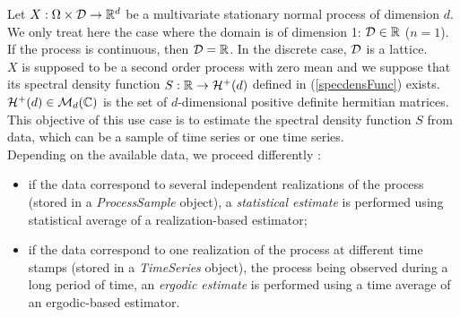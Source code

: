 \renewcommand{\filename}{docUC_StocProc_DensitySpectralModel_Estimation.tex}
\renewcommand{\filetitle}{UC : Estimation of a spectral density function}

\HeaderIIILevel


Let $X: \Omega \times {\mathcal D} \rightarrow {\mathbb R}^d$  be a multivariate  stationary normal process of dimension $d$. We only treat here the case where the domain is of dimension 1: ${\mathcal D} \in {\mathbb R}$ ($n=1$). \\
If the process is continuous, then ${\mathcal D}={\mathbb R}$. In the discrete case, ${\mathcal D}$  is a lattice. \\


$X$ is supposed to be a second order process with zero mean and we suppose that its spectral density function $S : {\mathbb R} \rightarrow \mathcal{H}^+(d)$ defined in (\ref{specdensFunc}) exists. $\mathcal{H}^+(d) \in \mathcal{M}_d({\mathbb C})$ is the set of $d$-dimensional positive definite hermitian matrices.\\


This objective of this use case is to estimate the spectral density function $S$ from data, which can be a sample of time series or one time series.\\
Depending on the available data, we proceed differently :
\begin{itemize}
\item if the data correspond to  several independent  realizations of the  process (stored in a \textit{ProcessSample} object), a \emph{statistical estimate} is performed using statistical average of a realization-based estimator;
\item if the data correspond to one realization of the  process  at different time stamps (stored in a  \textit{TimeSeries} object), the process being observed during a long period of time, an \emph{ergodic estimate} is performed using a time average of an ergodic-based estimator.
\end{itemize}

